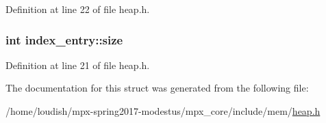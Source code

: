 Definition at line 22 of file heap.\+h.

\subsubsection[{\texorpdfstring{size}{size}}]{\setlength{\rightskip}{0pt plus 5cm}int index\+\_\+entry\+::size}\hypertarget{structindex__entry_a2b0247aae5c7f9884f8eef1ee121adb0}{}\label{structindex__entry_a2b0247aae5c7f9884f8eef1ee121adb0}


Definition at line 21 of file heap.\+h.



The documentation for this struct was generated from the following file\+:\begin{DoxyCompactItemize}
\item 
/home/loudish/mpx-\/spring2017-\/modestus/mpx\+\_\+core/include/mem/\hyperlink{heap_8h}{heap.\+h}\end{DoxyCompactItemize}
